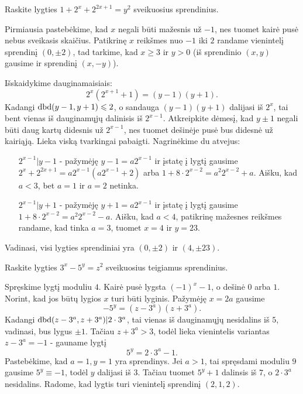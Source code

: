 \begin{pav} \text{\emph{[IMO 2006]}} Raskite lygties $1 + 2^x + 2^{2x+1} = y^2$
  sveikuosius sprendinius.
\end{pav}
Pirmiausia pastebėkime, kad $x$ negali būti mažesnis už $-1$, nes tuomet
kairė pusė nebus sveikasis skaičius. Patikrinę $x$ reikšmes nuo
$-1$ iki $2$ randame vienintelį sprendinį $(0, \pm 2)$, tad tarkime, kad
$x\geq 3$ ir $y>0$ (iš sprendinio $(x,y)$ gausime ir sprendinį $(x,
-y)$). 

Išskaidykime dauginamaisiais: $$2^x(2^{x+1} +1) = (y-1)(y+1).$$
Kadangi $\operatorname{dbd}(y-1, y+1) \leqslant 2$, o sandauga $(y-1)(y+1)$ dalijasi iš
$2^x$, tai bent vienas iš dauginamųjų dalinisis iš $2^{x-1}$. Atkreipkite
dėmesį, kad $y\pm 1$ negali būti daug kartų didesnis už $2^{x-1}$, nes
tuomet dešinėje pusė bus didesnė už kairiąją. Lieka viską tvarkingai
pabaigti. Nagrinėkime du atvejus:
\begin{itemize}
  \item[$2^{x-1}|y-1$ -] pažymėję $y-1 = a2^{x-1}$ ir įstatę į lygtį
    gausime $2^x + 2^{2x+1} = a2^{x-1}(a2^{x-1} + 2)$ arba $1 + 8\cdot
    2^{x-2} = a^2 2^{x-2} + a.$ Aišku, kad $a<3$, bet $a=1$ ir $a=2$
    netinka.
  \item[$2^{x-1}|y+1$ -] pažymėję $y+1 = a2^{x-1}$ ir įstatę į lygtį
    gausime $1+8\cdot 2^{x-2} = a^2 2^{x-2} - a$. Aišku, kad $a<4$,
    patikrinę mažesnes reikšmes randame, kad tinka $a=3$, tuomet $x=4$ ir
    $y=23$. 
\end{itemize}
Vadinasi, visi lygties sprendiniai yra $(0, \pm 2)$ ir $(4, \pm 23)$.

\begin{pav} \text{\emph{[BMO 2009]}} Raskite lygties $3^x - 5^y = z^2$ sveikuosius
  teigiamus sprendinius.
\end{pav}

\begin{sprendimas}
  Spręskime lygtį moduliu $4$. Kairė pusė lygsta $(-1)^x - 1$, o dešinė
  $0$ arba $1$. Norint, kad jos būtų lygios $x$ turi būti lyginis. Pažymėję
  $x=2a$ gausime $$-5^y = (z-3^a)(z+3^a).$$
  Kadangi $\operatorname{dbd}(z-3^a, z+3^a)|2\cdot 3^a$, tai vienas iš dauginamųjų
  nesidalins iš $5$, vadinasi, bus lygus $\pm 1$. Tačiau $z+3^a > 3$, todėl
  lieka vienintelis variantas $z - 3^a = -1$ - gauname lygtį $$5^y = 2\cdot
  3^a - 1.$$
  Pastebėkime, kad $a=1, y=1$ yra sprendinys. Jei $a>1$, tai spręsdami
  moduliu $9$ gausime $5^y \equiv -1$, todėl $y$ dalijasi iš $3$. Tačiau
  tuomet $5^y + 1$ dalinsis iš $7$, o $2\cdot 3^a$ nesidalins. Radome, kad
  lygtis turi vienintelį sprendinį $(2,1,2)$.
\end{sprendimas}

